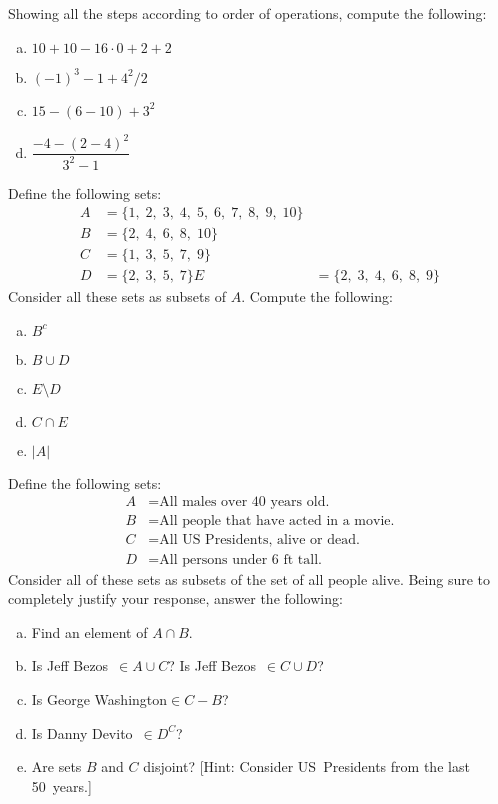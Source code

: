\documentclass[11pt,letterpaper]{article}
\begin{document}

 Showing all the steps according to order of operations, compute the following:
	\begin{enumerate}[(a)]
	\item $10 + 10 - 16 \cdot 0 + 2 + 2$
	\item $(-1)^3 - 1 + 4^2/2$
	\item $15 - (6 - 10) + 3^2$
	\item $\dfrac{-4 - (2 - 4)^2}{3^2 - 1}$
	\end{enumerate}



\newpage



 Define the following sets:
	\[
	\begin{aligned}
	A&= \{ 1,\; 2, \; 3,\; 4,\; 5,\; 6,\; 7,\; 8,\; 9,\; 10 \} \\
	B&= \{ 2,\; 4,\; 6,\; 8,\; 10 \} \\
	C&= \{ 1,\; 3,\; 5,\; 7,\; 9 \} \\
	D&= \{ 2,\; 3,\; 5,\; 7 \}
	E&= \{ 2,\; 3,\; 4,\; 6,\; 8,\; 9 \}
	\end{aligned}
	\]
Consider all these sets as subsets of $A$. Compute the following:
	\begin{enumerate}[(a)]
	\item $B^c$
	\item $B \cup D$
	\item $E \setminus D$
	\item $C \cap E$
	\item $|A|$
	\end{enumerate}



\newpage



 Define the following sets:
	\[
	\begin{aligned}
	A&= \text{All males over 40~years old.} \\ 
	B&= \text{All people that have acted in a movie.} \\
	C&= \text{All US Presidents, alive or dead.} \\
	D&= \text{All persons under 6~ft tall.} 
	\end{aligned}
	\]
Consider all of these sets as subsets of the set of all people alive. Being sure to completely justify your response, answer the following:
	\begin{enumerate}[(a)]
	\item Find an element of $A \cap B$. 
	\item Is Jeff Bezos~$\in A \cup C$? Is Jeff Bezos~$\in C \cup D$?
	\item Is George Washington$\in C - B$?
	\item Is Danny Devito~$\in D^C$?
	\item Are sets $B$ and $C$ disjoint? [Hint: Consider US~Presidents from the last 50~years.]
	\end{enumerate}
\end{document}
